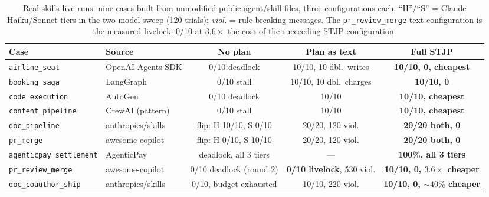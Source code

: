 \documentclass{article}
\newcommand{\stjp}{\textsc{STJP}}
\begin{document}
\begin{table}[t]
\centering\footnotesize
\caption{Real-skills live runs: nine cases built from unmodified public agent/skill files, three configurations each. ``H''/``S'' = Claude Haiku/Sonnet tiers in the two-model sweep (120 trials); \emph{viol.} = rule-breaking messages. The \texttt{pr\_review\_merge} text configuration is the measured livelock: 0/10 at $3.6\times$ the cost of the succeeding \stjp{} configuration.}
\label{tab:realcases}
\begin{tabular}{@{}llccc@{}}
\toprule
\textbf{Case} & \textbf{Source} & \textbf{No plan} & \textbf{Plan as text} & \textbf{Full \stjp{}} \\
\midrule
\texttt{airline\_seat} & OpenAI Agents SDK & 0/10 deadlock & 10/10, 10 dbl.\ writes & \textbf{10/10, 0, cheapest} \\
\texttt{booking\_saga} & LangGraph & 0/10 stall & 10/10, 10 dbl.\ charges & \textbf{10/10, 0} \\
\texttt{code\_execution} & AutoGen & 0/10 deadlock & 10/10 & \textbf{10/10, cheapest} \\
\texttt{content\_pipeline} & CrewAI (pattern) & 0/10 stall & 10/10 & \textbf{10/10, cheapest} \\
\texttt{doc\_pipeline} & anthropics/skills & flip: H 10/10, S 0/10 & 20/20, 120 viol. & \textbf{20/20 both, 0} \\
\texttt{pr\_merge} & awesome-copilot & flip: H 0/10, S 10/10 & 20/20, 120 viol. & \textbf{20/20 both, 0} \\
\texttt{agenticpay\_settlement} & AgenticPay & deadlock, all 3 tiers & --- & \textbf{100\%, all 3 tiers} \\
\texttt{pr\_review\_merge} & awesome-copilot & 0/10 deadlock (round 2) & \textbf{0/10 livelock}, 530 viol. & \textbf{10/10, 0, $3.6\times$ cheaper} \\
\texttt{doc\_coauthor\_ship} & anthropics/skills & 0/10, budget exhausted & 10/10, 220 viol. & \textbf{10/10, 0, ${\sim}40\%$ cheaper} \\
\bottomrule
\end{tabular}
\end{table}
\end{document}
